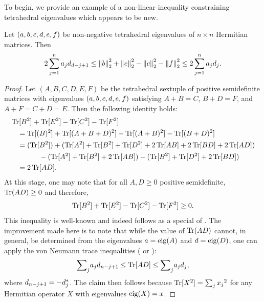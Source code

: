 \documentclass[notitlepage, 10pt]{article}
\begin{document}
To begin, we provide an example of a non-linear inequality constraining tetrahedral eigenvalues which appears to be new.
\begin{prop}
    \label{prop:simple_quadratic}
    Let $(a,b,c,d,e,f)$ be non-negative tetrahedral eigenvalues of $n\times n$ Hermitian matrices.
    Then
    \begin{equation}
    2 \sum_{j=1}^{n}a_jd_{d-j+1} \leq \left\lVert b\right\rVert_2^2 + \left\lVert e\right\rVert_2^2 - \left\lVert c\right\rVert_2^2- \left\lVert f\right\rVert_2^2 \leq 2 \sum_{j=1}^{n}a_jd_j.
    \end{equation}
\end{prop}
\begin{proof}
    Let $(A,B,C,D,E,F)$ be the tetrahedral sextuple of positive semidefinite matrices
    with eigenvalues $(a,b,c,d,e,f)$
    satisfying $A+B=C$, $B+D=F$, and $A+F=C+D=E$.
    Then the following identity holds:
    \begin{align}
        \label{eq:quad_identity}
        \begin{split}
            & \operatorname{Tr}[B^2] + \operatorname{Tr}[E^2] - \operatorname{Tr}[C^2] - \operatorname{Tr}[F^2] \\
            &\quad=\operatorname{Tr}[(B)^2] + \operatorname{Tr}[(A+B+D)^2] - \operatorname{Tr}[(A+B)^2] - \operatorname{Tr}[(B+D)^2] \\
            &\quad=
            (\operatorname{Tr}[B^2])
            +(\operatorname{Tr}[A^2] + \operatorname{Tr}[B^2] + \operatorname{Tr}[D^2] + 2\operatorname{Tr}[AB] + 2\operatorname{Tr}[BD] + 2 \operatorname{Tr}[AD])\\
            &\qquad\qquad-(\operatorname{Tr}[A^2] + \operatorname{Tr}[B^2] + 2\operatorname{Tr}[AB])
            -(\operatorname{Tr}[B^2] + \operatorname{Tr}[D^2] + 2\operatorname{Tr}[BD])\\
            &\quad= 2 \operatorname{Tr}[AD].
        \end{split}
    \end{align}
    At this stage, one may note that for all $A,D \geq 0$ positive semidefinite, $\operatorname{Tr}(AD) \geq 0$ and therefore,
    \begin{equation}
        \label{eq:quadratic_difference_pos}
        \operatorname{Tr}[B^2] + \operatorname{Tr}[E^2] - \operatorname{Tr}[C^2] - \operatorname{Tr}[F^2] \geq 0.
    \end{equation}
    This inequality is well-known and indeed follows as a special of \cite[Proposition 2.3]{sagnol2013approximation}.
    The improvement made here is to note that while the value of $\operatorname{Tr}(AD)$ cannot, in general, be determined from the eigenvalues $a = \operatorname{eig}(A)$ and $d = \operatorname{eig}(D)$, one can apply the von Neumann trace inequalities (\cite[H.1.g \& H.1.h]{marshall2010inequalities} or \cite[Proposition 4.4]{bauschke2001hyperbolic}):
    \begin{equation}
        {\sum}_{j} a_j d_{n-j+1} \leq \operatorname{Tr}[AD] \leq {\sum}_{j} a_j d_j,
    \end{equation}
    where $d_{n-j+1} = -d^{*}_j$.
    The claim then follows because $\operatorname{Tr}[X^2] = \sum_{j}{x_{j}}^2$ for any Hermitian operator $X$ with eigenvalues $\operatorname{eig}(X) = x$.
\end{proof}
\end{document}
